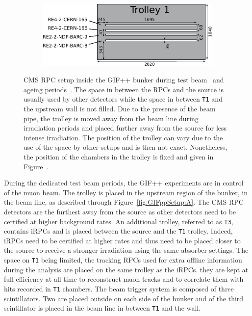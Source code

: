 \begin{figure}[H]
\begin{subfigure}{0.5\linewidth}
    	\end{subfigure}
    	\begin{subfigure}{\linewidth}
    		\vspace*{5mm}
			\centering
    		\includegraphics[width = 0.8\plotwidth]{fig/chapt5/GIFpp-T1.pdf}
        	\caption{\label{fig:GIFppSetup:C}}
    	\end{subfigure}
		\caption{\label{fig:GIFppSetup} CMS RPC setup inside the GIF++ bunker during test beam~ and ageing periods~. The space in between the RPCs and the source is usually used by other detectors while the space in between \texttt{T1} and the upstream wall is not filled. Due to the presence of the beam pipe, the trolley is moved away from the beam line during irradiation periods and placed further away from the source for less intense irradiation. The position of the trolley can vary due to the use of the space by other setups and is then not exact. Nonetheless, the position of the chambers in the trolley is fixed and given in Figure~.}
	\end{figure}
	
	During the dedicated test beam periods, the GIF++ experiments are in control of the muon beam. The trolley is placed in the upstream region of the bunker, in the beam line, as described through Figure~\ref{fig:GIFppSetup:A}. The CMS RPC detectors are the furthest away from the source as other detectors need to be certified at higher background rates. An additional trolley, referred to as \texttt{T3}, contains iRPCs and is placed between the source and the \texttt{T1} trolley. Indeed, iRPCs need to be certified at higher rates and thus need to be placed closer to the source to receive a stronger irradiation using the same absorber settings. The space on \texttt{T1} being limited, the tracking RPCs used for extra offline information during the analysis are placed on the same trolley as the iRPCs. they are kept at full efficiency at all time to reconstruct muon tracks and to correlate them with hits recorded in \texttt{T1} chambers. The beam trigger system is composed of three scintillators. Two are placed outside on each side of the bunker and of the third scintillator is placed in the beam line in between \texttt{T1} and the wall.
	
